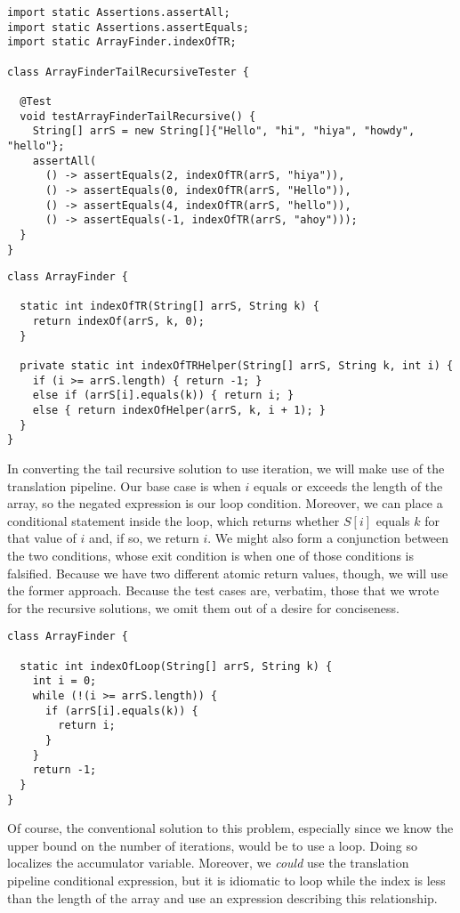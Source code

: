 \begin{lstlisting}[language=MyJava]
import static Assertions.assertAll;
import static Assertions.assertEquals;
import static ArrayFinder.indexOfTR;

class ArrayFinderTailRecursiveTester {

  @Test
  void testArrayFinderTailRecursive() {
    String[] arrS = new String[]{"Hello", "hi", "hiya", "howdy", "hello"};
    assertAll(
      () -> assertEquals(2, indexOfTR(arrS, "hiya")),
      () -> assertEquals(0, indexOfTR(arrS, "Hello")),
      () -> assertEquals(4, indexOfTR(arrS, "hello")),
      () -> assertEquals(-1, indexOfTR(arrS, "ahoy")));
  }
}
\end{lstlisting}

\begin{lstlisting}[language=MyJava]
class ArrayFinder {

  static int indexOfTR(String[] arrS, String k) {
    return indexOf(arrS, k, 0);
  }

  private static int indexOfTRHelper(String[] arrS, String k, int i) {
    if (i >= arrS.length) { return -1; } 
    else if (arrS[i].equals(k)) { return i; } 
    else { return indexOfHelper(arrS, k, i + 1); }
  } 
}
\end{lstlisting}

In converting the tail recursive solution to use iteration, we will make use of the translation pipeline. Our base case is when $i$ equals or exceeds the length of the array, so the negated expression is our loop condition. Moreover, we can place a conditional statement inside the loop, which returns whether $S[i]$ equals $k$ for that value of $i$ and, if so, we return $i$. We might also form a conjunction between the two conditions, whose exit condition is when one of those conditions is falsified. Because we have two different atomic return values, though, we will use the former approach. Because the test cases are, verbatim, those that we wrote for the recursive solutions, we omit them out of a desire for conciseness.

\begin{lstlisting}[language=MyJava]
class ArrayFinder {

  static int indexOfLoop(String[] arrS, String k) {
    int i = 0;
    while (!(i >= arrS.length)) {
      if (arrS[i].equals(k)) { 
        return i; 
      }
    }
    return -1;
  }
}
\end{lstlisting}

Of course, the conventional solution to this problem, especially since we know the upper bound on the number of iterations, would be to use a  loop. Doing so localizes the accumulator variable. Moreover, we \emph{could} use the translation pipeline conditional expression, but it is idiomatic to loop while the index is less than the length of the array and use an expression describing this relationship.

